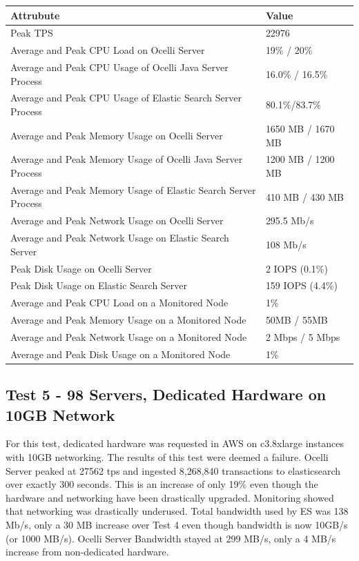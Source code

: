 \documentclass{llncs}
\begin{document}
\begin{flushleft}
    \begin{tabular}{ | l | l |}
    \hline
  Attrubute & Value  \\ \hline
  Peak TPS & 22976  \\ \hline
  Average and Peak CPU Load on Ocelli Server &19\% / 20\%  \\ \hline
  Average and Peak CPU Usage of Ocelli Java Server Process & 16.0\% / 16.5\% \\ \hline
 Average and Peak CPU Usage of Elastic Search Server Process & 80.1\%/83.7\%	  \\ \hline
  Average and Peak Memory Usage on Ocelli Server & 1650 MB / 1670 MB	 \\ \hline
  Average and Peak Memory Usage of Ocelli Java Server Process &	1200 MB / 1200 MB		 \\ \hline
 Average and Peak Memory Usage of Elastic Search Server Process &	410 MB / 430 MB		 \\ \hline
Average and Peak Network Usage on Ocelli Server &	295.5 Mb/s 	 \\ \hline
Average and Peak Network Usage on Elastic Search Server & 108 Mb/s 	 \\ \hline
Peak Disk Usage on Ocelli Server &	2 IOPS (0.1\%)		 \\ \hline
Peak Disk Usage on Elastic Search Server &	159 IOPS (4.4\%)		 \\ \hline
Average and Peak CPU Load on a Monitored Node& 	1\% 	 \\ \hline
  Average and Peak Memory Usage on a Monitored Node &	50MB / 55MB	 \\ \hline
Average and Peak Network Usage on a Monitored Node &	2 Mbps / 5 Mbps		 \\ \hline
  Average and Peak Disk Usage on a Monitored Node &  1\%	\\ 
    \hline
    \end{tabular}
\end{flushleft}

\subsection{Test 5 - 98 Servers, Dedicated Hardware on 10GB Network}

For this test, dedicated hardware was requested in AWS on c3.8xlarge instances with 10GB networking. The results of this test were deemed a failure. Ocelli Server peaked at 27562 tps and ingested 8,268,840 transactions to elasticsearch over exactly 300 seconds. This is an increase of only 19\% even though the hardware and networking have been drastically upgraded. Monitoring showed that networking was drastically underused. Total bandwidth used by ES was 138 Mb/s, only a 30 MB increase over Test 4 even though bandwidth is now 10GB/s (or 1000 MB/s). Ocelli Server Bandwidth stayed at 299 MB/s, only a 4 MB/s increase from non-dedicated hardware.
\end{document}
